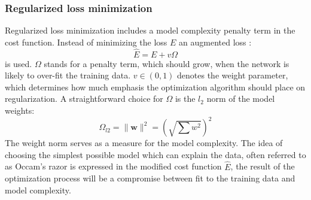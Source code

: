 \subsubsection{Regularized loss minimization}
Regularized loss minimization includes a model complexity penalty term in the cost function. Instead of minimizing the loss $E$ an augmented loss \cite[p. 338]{Bishop1995}\cite[p. 171]{Ben-david2014}:
\begin{equation}
\hat{E} = E + v\Omega
\end{equation}
is used. $\Omega$ stands for a penalty term, which should grow, when the network is likely to over-fit the training data. $v \in (0,1)$ denotes the weight parameter, which determines how much emphasis the optimization algorithm should place on regularization. A straightforward choice for $\Omega$ is the $l_2$ norm of the model weights:
\begin{equation}
\Omega_{l2} = \|\mathbf{w}\|^2 = (\sqrt{ \sum w^2})^2
\end{equation}
The weight norm serves as a measure for the model complexity. The idea of choosing the simplest possible model which can explain the data, often referred to as Occam's razor is expressed in the modified cost function $\hat{E}$, the result of the optimization process will be a compromise between fit to the training data and model complexity.


